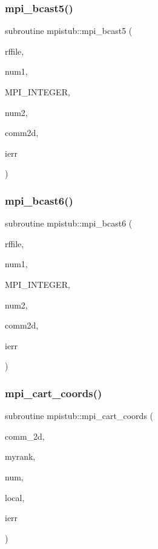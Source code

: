\mbox{\label{namespacempistub_a79437cd731fca94bcf720d8abd6cec77}} 
\subsubsection{\texorpdfstring{mpi\_bcast5()}{mpi\_bcast5()}}
{\footnotesize\ttfamily subroutine mpistub\+::mpi\+\_\+bcast5 (\begin{DoxyParamCaption}\item[{double precision, dimension(\+:,\+:)}]{rffile,  }\item[{}]{num1,  }\item[{}]{M\+P\+I\+\_\+\+I\+N\+T\+E\+G\+ER,  }\item[{}]{num2,  }\item[{integer}]{comm2d,  }\item[{}]{ierr }\end{DoxyParamCaption})}

\mbox{\label{namespacempistub_aca21309e40e0374a92a5e2a163110d1c}} 
\subsubsection{\texorpdfstring{mpi\_bcast6()}{mpi\_bcast6()}}
{\footnotesize\ttfamily subroutine mpistub\+::mpi\+\_\+bcast6 (\begin{DoxyParamCaption}\item[{double precision, dimension(\+:,\+:,\+:)}]{rffile,  }\item[{}]{num1,  }\item[{}]{M\+P\+I\+\_\+\+I\+N\+T\+E\+G\+ER,  }\item[{}]{num2,  }\item[{integer}]{comm2d,  }\item[{}]{ierr }\end{DoxyParamCaption})}

\mbox{\label{namespacempistub_a599bb38fd4a9f405ced50d48c09116ca}} 
\subsubsection{\texorpdfstring{mpi\_cart\_coords()}{mpi\_cart\_coords()}}
{\footnotesize\ttfamily subroutine mpistub\+::mpi\+\_\+cart\+\_\+coords (\begin{DoxyParamCaption}\item[{integer}]{comm\+\_\+2d,  }\item[{}]{myrank,  }\item[{}]{num,  }\item[{integer, dimension(\+:)}]{local,  }\item[{}]{ierr }\end{DoxyParamCaption})}

